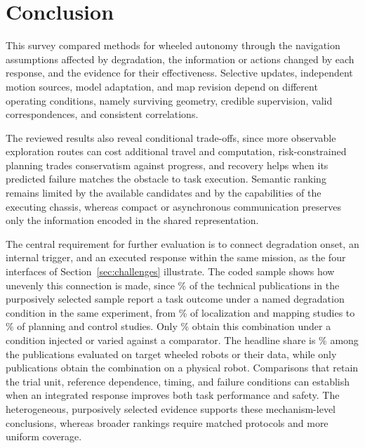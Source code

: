 \section{Conclusion}
\label{sec:conclusion}
This survey compared methods for wheeled autonomy through the navigation assumptions affected by degradation, the information or actions changed by each response, and the evidence for their effectiveness. Selective updates, independent motion sources, model adaptation, and map revision depend on different operating conditions, namely surviving geometry, credible supervision, valid correspondences, and consistent correlations.

The reviewed results also reveal conditional trade-offs, since more observable exploration routes can cost additional travel and computation, risk-constrained planning trades conservatism against progress, and recovery helps when its predicted failure matches the obstacle to task execution. Semantic ranking remains limited by the available candidates and by the capabilities of the executing chassis, whereas compact or asynchronous communication preserves only the information encoded in the shared representation.

The central requirement for further evaluation is to connect degradation onset, an internal trigger, and an executed response within the same mission, as the four interfaces of Section~\ref{sec:challenges} illustrate. The coded sample shows how unevenly this connection is made, since \DegTaskShare\% of the technical publications in the purposively selected sample report a task outcome under a named degradation condition in the same experiment, from \LocSameShare\% of localization and mapping studies to \PlnSameShare\% of planning and control studies. Only \DOneSameShare\% obtain this combination under a condition injected or varied against a comparator. The headline share is \WhlShare\% among the \GroupWHL{} publications evaluated on target wheeled robots or their data, while only \PhysSameCount{} publications obtain the combination on a physical robot. Comparisons that retain the trial unit, reference dependence, timing, and failure conditions can establish when an integrated response improves both task performance and safety. The heterogeneous, purposively selected evidence supports these mechanism-level conclusions, whereas broader rankings require matched protocols and more uniform coverage.
